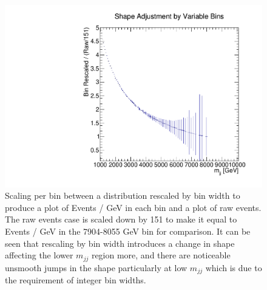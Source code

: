 \begin{figure}
    \centering
    \includegraphics[trim=3 8 35 48, clip,width=1.0\linewidth]{figures/app-GlobalFitStudies/BinningShapeAdjustment.pdf}
    \caption{Scaling per bin between a distribution rescaled by bin width to produce a plot of Events / GeV in each bin and a plot of raw events. The raw events case is scaled down by 151 to make it equal to Events / GeV in the 7904-8055 GeV bin for comparison. It can be seen that rescaling by bin width introduces a change in shape affecting the lower $m_{jj}$ region more, and there are noticeable unsmooth jumps in the shape particularly at low $m_{jj}$ which is due to the requirement of integer bin widths.}
    \label{fig:BinningShapeAdjustment}
\end{figure}


